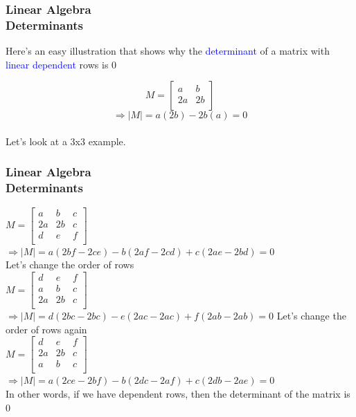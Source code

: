 \documentclass[hyperref={pdfpagelabels=true}]{beamer}
\begin{document}
\begin{frame}
\frametitle{Linear Algebra \\ {\large Determinants}}
Here's an easy illustration that shows why the \textcolor{blue}{determinant} of a matrix with \textcolor{blue}{linear dependent} rows is 0

$$M=\begin{bmatrix}
    a       & b \\
    2a     &2b \\
\end{bmatrix}$$
$$\Rightarrow |M|=a(2b) - 2b(a)=0$$  \\
Let's look at a 3x3 example.
\end{frame}

\begin{frame}
\frametitle{Linear Algebra \\ {\large Determinants}}
$M=\begin{bmatrix}
    a       & b  &c\\
    2a     &2b &c\\
    d       &e   &f\\
\end{bmatrix}$ \\
$\Rightarrow |M|=a(2bf-2ce) - b(2af-2cd)+c(2ae-2bd)=0$ \\
Let's change the order of rows \\
$M=\begin{bmatrix}
 d       &e   &f\\   
 a       & b  &c\\
    2a     &2b &c\\
\end{bmatrix}$ \\
$\Rightarrow |M|=d(2bc - 2bc) - e(2ac - 2ac) + f (2ab - 2ab)=0$
Let's change the order of rows again\\
$M=\begin{bmatrix}
 d       &e   &f\\ 
 2a     &2b &c\\  
 a       & b  &c\\
\end{bmatrix}$ \\
$\Rightarrow |M|=a(2ce - 2bf ) - b(2dc - 2af ) + c(2db - 2ae)=0$ \\
In other words, if we have dependent rows, then the determinant of the
matrix is 0
\end{frame}
  
\end{document}
